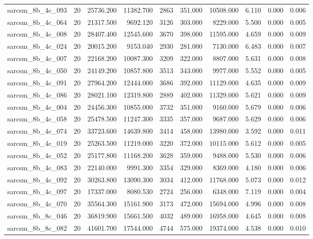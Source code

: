 \begin{tabular}{lrrrrrrrrr}
sarcsm\_8b\_4c\_093 & 20 & 25736.200 & 11382.700 & 2863 & 351.000 & 10508.000 & 6.110 & 0.000 & 0.006 \\
sarcsm\_8b\_4c\_064 & 20 & 21317.500 & 9692.120 & 3126 & 303.000 & 8229.000 & 5.500 & 0.000 & 0.005 \\
sarcsm\_8b\_4c\_008 & 20 & 28407.400 & 12545.600 & 3670 & 398.000 & 11595.000 & 4.659 & 0.000 & 0.009 \\
sarcsm\_8b\_4c\_024 & 20 & 20015.200 & 9153.040 & 2930 & 281.000 & 7130.000 & 6.483 & 0.000 & 0.007 \\
sarcsm\_8b\_4c\_007 & 20 & 22168.200 & 10087.300 & 3209 & 322.000 & 8807.000 & 5.631 & 0.000 & 0.008 \\
sarcsm\_8b\_4c\_050 & 20 & 24149.200 & 10857.800 & 3513 & 343.000 & 9977.000 & 5.552 & 0.000 & 0.005 \\
sarcsm\_8b\_4c\_091 & 20 & 27964.200 & 12444.000 & 3686 & 392.000 & 11129.000 & 4.635 & 0.000 & 0.009 \\
sarcsm\_8b\_4c\_086 & 20 & 28021.100 & 12319.800 & 2889 & 402.000 & 11329.000 & 5.621 & 0.000 & 0.009 \\
sarcsm\_8b\_4c\_004 & 20 & 24456.300 & 10855.000 & 3732 & 351.000 & 9160.000 & 5.679 & 0.000 & 0.006 \\
sarcsm\_8b\_4c\_058 & 20 & 25478.500 & 11247.300 & 3335 & 357.000 & 9687.000 & 5.629 & 0.000 & 0.006 \\
sarcsm\_8b\_4c\_074 & 20 & 33723.600 & 14639.800 & 3414 & 458.000 & 13980.000 & 3.592 & 0.000 & 0.011 \\
sarcsm\_8b\_4c\_019 & 20 & 25263.500 & 11219.000 & 3220 & 372.000 & 10115.000 & 5.612 & 0.000 & 0.005 \\
sarcsm\_8b\_4c\_052 & 20 & 25177.800 & 11168.200 & 3628 & 359.000 & 9488.000 & 5.530 & 0.000 & 0.006 \\
sarcsm\_8b\_4c\_083 & 20 & 22140.000 & 9991.300 & 3354 & 329.000 & 8369.000 & 4.180 & 0.000 & 0.006 \\
sarcsm\_8b\_4c\_092 & 20 & 30263.800 & 13090.300 & 3034 & 412.000 & 11768.000 & 5.073 & 0.000 & 0.012 \\
sarcsm\_8b\_4c\_097 & 20 & 17337.000 & 8080.530 & 2724 & 256.000 & 6348.000 & 7.119 & 0.000 & 0.004 \\
sarcsm\_8b\_4c\_070 & 20 & 35564.300 & 15161.900 & 3173 & 472.000 & 15694.000 & 4.996 & 0.000 & 0.008 \\
sarcsm\_8b\_8c\_046 & 20 & 36819.900 & 15661.500 & 4032 & 489.000 & 16958.000 & 4.645 & 0.000 & 0.008 \\
sarcsm\_8b\_8c\_082 & 20 & 41601.700 & 17544.000 & 4744 & 575.000 & 19374.000 & 4.538 & 0.000 & 0.010 \\

\end{tabular}
